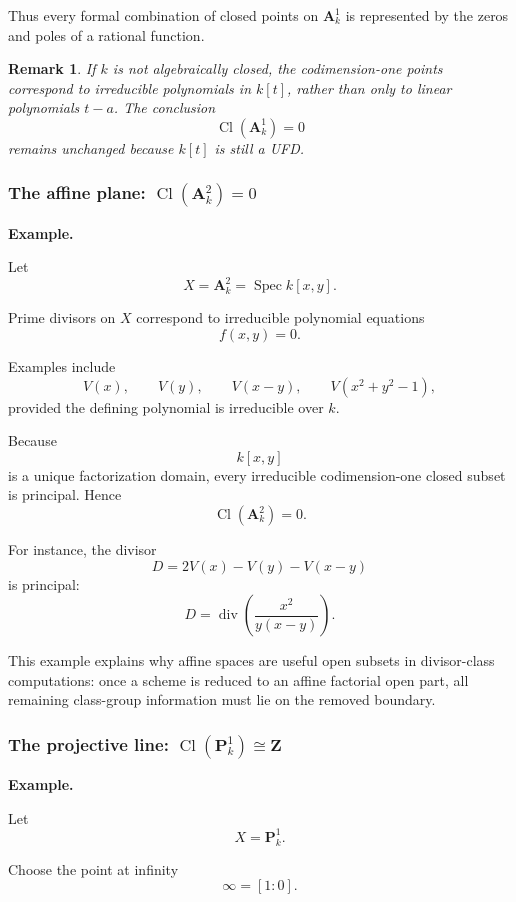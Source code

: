 \documentclass[12pt,a4paper]{article}
\theoremstyle{notespace}
\newtheorem{remark}[definition]{Remark}
\begin{document}
Thus every formal combination of closed points on \(\mathbf A^1_k\) is represented by the zeros and poles of a rational function.

\begin{remark}
	If \(k\) is not algebraically closed, the codimension-one points correspond to irreducible polynomials in \(k[t]\), rather than only to linear polynomials \(t-a\). The conclusion
	\[
	\operatorname{Cl}(\mathbf A^1_k)=0
	\]
	remains unchanged because \(k[t]\) is still a UFD.
\end{remark}

\subsubsection{\texorpdfstring{The affine plane: \(\operatorname{Cl}(\mathbf A^2_k)=0\)}{The affine plane}}

\textbf{Example.}

Let
\[
X=\mathbf A^2_k=\operatorname{Spec}k[x,y].
\]

Prime divisors on \(X\) correspond to irreducible polynomial equations
\[
f(x,y)=0.
\]

Examples include
\[
V(x),\qquad
V(y),\qquad
V(x-y),\qquad
V(x^2+y^2-1),
\]
provided the defining polynomial is irreducible over \(k\).

Because
\[
k[x,y]
\]
is a unique factorization domain, every irreducible codimension-one closed subset is principal. Hence
\[
\boxed{
	\operatorname{Cl}(\mathbf A^2_k)=0.
}
\]

For instance, the divisor
\[
D=2V(x)-V(y)-V(x-y)
\]
is principal:
\[
D
=
\operatorname{div}\left(\frac{x^2}{y(x-y)}\right).
\]

This example explains why affine spaces are useful open subsets in divisor-class computations: once a scheme is reduced to an affine factorial open part, all remaining class-group information must lie on the removed boundary.

\subsubsection{\texorpdfstring{The projective line: \(\operatorname{Cl}(\mathbf P^1_k)\cong \mathbf Z\)}{The projective line}}

\textbf{Example.}

Let
\[
X=\mathbf P^1_k.
\]

Choose the point at infinity
\[
\infty=[1:0].
\]
\end{document}
